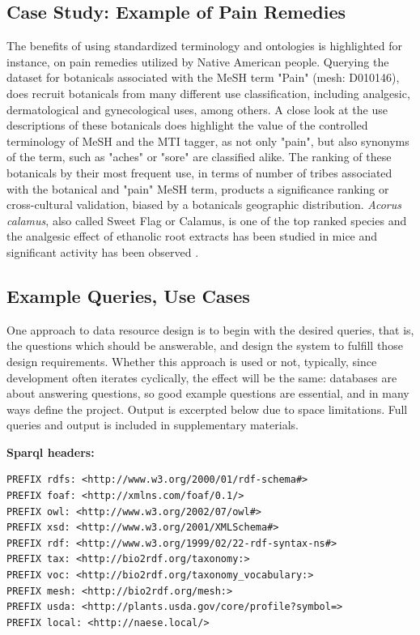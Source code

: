 \documentclass{acm_proc_article-sp}
\begin{document}
\subsection{Case Study: Example of Pain Remedies}
The benefits of using standardized terminology and ontologies is highlighted for instance, on pain remedies utilized by Native American people. Querying the dataset for botanicals associated with the MeSH term "Pain" (mesh: D010146), does recruit botanicals from many different use classification, including analgesic, dermatological and gynecological uses, among others. A close look at the use descriptions of these botanicals does highlight the value of the controlled terminology of MeSH and the MTI tagger, as not only "pain", but also synonyms of the term, such as "aches" or "sore" are classified alike. The ranking of these botanicals by their most frequent use, in terms of number of tribes associated with the botanical and "pain" MeSH term, products a significance ranking or cross-cultural validation, biased by a botanicals geographic distribution. \textit{Acorus calamus}, also called Sweet Flag or Calamus, is one of the top ranked species and the analgesic effect of ethanolic root extracts has been studied in mice and significant activity has been observed \cite{Khan:2012}.

\subsection{Example Queries, Use Cases}
One approach to data resource design is to begin with the desired queries, that is, the questions which should be answerable, and design the system to fulfill those design requirements. Whether this approach is used or not, typically, since development often iterates cyclically, the effect will be the same: databases are about answering questions, so good example questions are essential, and in many ways define the project. Output is excerpted below due to space limitations. Full queries and output is included in supplementary materials.

\textbf{Sparql headers:}
\begin{lstlisting}
PREFIX rdfs: <http://www.w3.org/2000/01/rdf-schema#>
PREFIX foaf: <http://xmlns.com/foaf/0.1/>
PREFIX owl: <http://www.w3.org/2002/07/owl#>
PREFIX xsd: <http://www.w3.org/2001/XMLSchema#>
PREFIX rdf: <http://www.w3.org/1999/02/22-rdf-syntax-ns#>
PREFIX tax: <http://bio2rdf.org/taxonomy:>
PREFIX voc: <http://bio2rdf.org/taxonomy_vocabulary:>
PREFIX mesh: <http://bio2rdf.org/mesh:>
PREFIX usda: <http://plants.usda.gov/core/profile?symbol=>
PREFIX local: <http://naese.local/>
\end{lstlisting}
\end{document}
